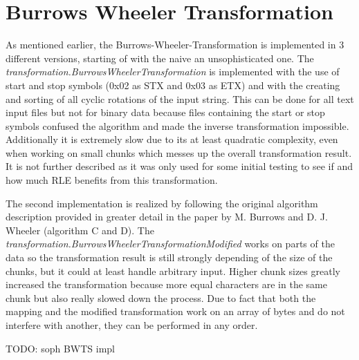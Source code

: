 \section{Burrows Wheeler Transformation}
\par{
	As mentioned earlier, the Burrows-Wheeler-Transformation is implemented in 3 different versions, starting of with the naive an unsophisticated one. The \emph{transformation.BurrowsWheelerTransformation} is implemented with the use of start and stop symbols (0x02 as STX and 0x03 as ETX) and with the creating and sorting of all cyclic rotations of the input string. This can be done for all text input files but not for binary data because files containing the start or stop symbols confused the algorithm and made the inverse transformation impossible. Additionally it is extremely slow due to its at least quadratic complexity, even when working on small chunks which messes up the overall transformation result. It is not further described as it was only used for some initial testing to see if and how much RLE benefits from this transformation. 
}
\par{
	The second implementation is realized by following the original algorithm description provided in greater detail in the paper by M. Burrows and D. J. Wheeler \cite{Burrows94} (algorithm C and D). The \emph{transformation.BurrowsWheelerTransformationModified} works on parts of the data so the transformation result is still strongly depending of the size of the chunks, but it could at least handle arbitrary input. Higher chunk sizes greatly increased the transformation because more equal characters are in the same chunk but also really slowed down the process. Due to fact that both the mapping and the modified transformation work on an array of bytes and do not interfere with another, they can be performed in any order.
}

\par{
	TODO: soph BWTS impl
}
